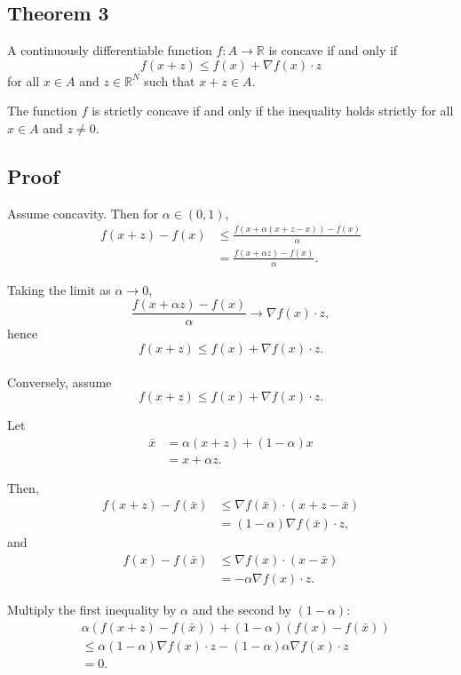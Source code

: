\begin{tcolorbox}[breakable, colback=white]
\subsection*{Theorem 3}

A continuously differentiable function $f : A \to \mathbb{R}$ is concave
if and only if
\[
f(x + z) \le f(x) + \nabla f(x) \cdot z
\]
for all $x \in A$ and $z \in \mathbb{R}^N$ such that $x + z \in A$.

The function $f$ is strictly concave if and only if the inequality holds strictly
for all $x \in A$ and $z \neq 0$.

\subsection*{Proof}

Assume concavity. Then for $\alpha \in (0,1)$,
\[
\begin{aligned}
f(x+z) - f(x)
&\le \frac{f(x + \alpha (x + z -x)) - f(x)}{\alpha}\\
&=\frac{f(x + \alpha z) - f(x)}{\alpha}.
\end{aligned}
\]


Taking the limit as $\alpha \to 0$,
\[
\frac{f(x + \alpha z) - f(x)}{\alpha} \to \nabla f(x) \cdot z,
\]
hence
\[
f(x+z) \le f(x) + \nabla f(x) \cdot z.
\]\\

Conversely, assume
\[
f(x+z) \le f(x) + \nabla f(x) \cdot z.
\]

Let
\[
\begin{aligned}
\bar{x} 
&= \alpha (x+z) + (1-\alpha)x \\
&= x + \alpha z.
\end{aligned}
\]

Then,
\[
\begin{aligned}
f(x+z) - f(\bar{x}) 
&\le \nabla f(\bar{x}) \cdot (x+z-\bar{x})\\
&=(1-\alpha)\nabla f(\bar{x}) \cdot z,
\end{aligned}
\]
and
\[
\begin{aligned}
f(x) - f(\bar{x}) 
&\le \nabla f(x) \cdot (x - \bar{x}) \\
&= -\alpha \nabla f(x) \cdot z.
\end{aligned}
\]

Multiply the first inequality by $\alpha$ and the second by $(1-\alpha)$:
\[
\begin{aligned}
&\alpha (f(x+z) - f(\bar{x})) + (1-\alpha)(f(x) - f(\bar{x}))\\
&\le \alpha(1-\alpha)\nabla f(x)\cdot z - (1-\alpha)\alpha \nabla f(x)\cdot z \\
&= 0.
\end{aligned}
\]


\end{tcolorbox}
